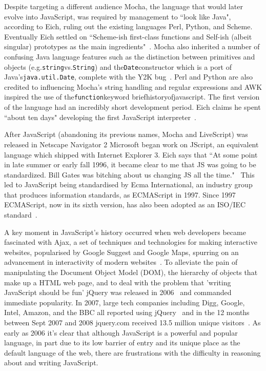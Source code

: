 \documentclass[]{final_report}
\begin{document}
Despite targeting a different audience Mocha, the language that would later evolve into JavaScript, was required by management to ``look like Java", according to Eich, ruling out the existing languages Perl, Python, and Scheme. Eventually Eich settled on ``Scheme-ish first-class functions and Self-ish (albeit singular) prototypes as the main ingredients"~\cite{popularityofjavascript}. Mocha also inherited a number of confusing Java language features such as the distinction between primitives and objects (e.g.\lstinline{string}vs.\lstinline{String}) and the\lstinline{Date}constructor which is a port of Java's\lstinline{java.util.Date}, complete with the Y2K bug~\cite{brendaneichtimetomakejscomment}. Perl and Python are also credited to influencing Mocha's string handling and regular expressions and AWK inspired the use of the\lstinline{function}keyword briefhistoryofjavascript. The first version of the language had an incredibly short development period. Eich claims he spent ``about ten days" developing the first JavaScript interpreter~\cite{AZProgrammingLanguages}.

After JavaScript (abandoning its previous names, Mocha and LiveScript) was released in Netscape Navigator 2 Microsoft began work on JScript, an equivalent language which shipped with Internet Explorer 3. Eich says that ``At some point in late summer or early fall 1996, it became clear to me that JS was going to be standardized. Bill Gates was bitching about us changing JS all the time."~\cite{newjavascriptmoduleowner} This led to JavaScript being standardised by Ecma International, an industry group that produces information standards, as ECMAScript in 1997. Since 1997 ECMAScript, now in its sixth version, has also been adopted as an ISO/IEC standard~\cite{ISO/IEC16262:2011}.

A key moment in JavaScript's history occurred when web developers became fascinated with Ajax, a set of techniques and technologies for making interactive websites, popularised by Google Suggest and Google Maps, spurring on an advancement in interactivity of modern websites~\cite{ajax}. To alleviate the pain of manipulating the Document Object Model (DOM), the hierarchy of objects that make up a HTML web page, and to deal with the problem that  'writing JavaScript should be fun' jQuery was released in 2006~\cite{historyofjquery} and commanded immediate popularity. In 2007, large tech companies including Digg, Google, Intel, Amazon, and the BBC all reported using jQuery~\cite{historyofjquery} and in the 12 months between Sept 2007 and 2008 jquery.com received 13.5 million unique visitors~\cite{stateofjquery}. As early as 2006 it's clear that although JavaScript is a powerful and popular language, in part due to its low barrier of entry and its unique place as the default language of the web, there are frustrations with the difficulty in reasoning about and writing JavaScript.
\end{document}
